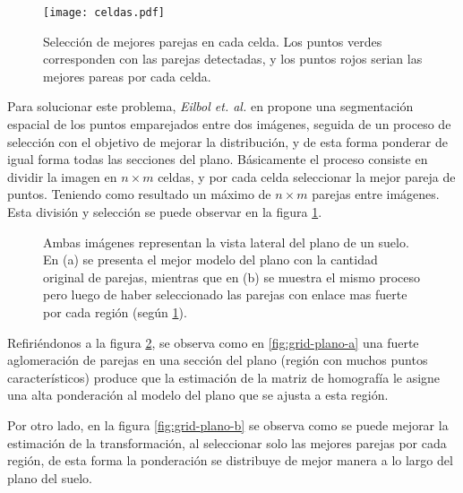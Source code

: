 \begin{figure}[hb]
	\centering
	\texttt{[image: celdas.pdf]}
	\caption[Selección de mejores parejas]{Selección de mejores parejas en cada celda. Los puntos verdes corresponden con las parejas detectadas, y los puntos rojos serian las mejores pareas por cada celda.}
	\label{imagen:celdas}
\end{figure}

Para solucionar este problema, \textit{Eilbol et. al.} en \cite{grid} propone una segmentación espacial de los puntos emparejados entre dos imágenes, seguida de un proceso de selección con el objetivo de mejorar la distribución, y de esta forma ponderar de igual forma todas las secciones del plano. Básicamente el proceso consiste en dividir la imagen en $n\times m$ celdas, y por cada celda seleccionar la mejor pareja de puntos. Teniendo como resultado un máximo de $n\times m$ parejas entre imágenes. Esta división y selección se puede observar en la figura \ref{imagen:celdas}.

\begin{figure}[ht]
	\centering     %
	
	\caption[Selección de mejores puntos, ejemplo con plano]{Ambas imágenes representan la vista lateral del plano de un suelo. En (a) se presenta el mejor modelo del plano con la cantidad original de parejas, mientras que en (b) se muestra el mismo proceso pero luego de haber seleccionado las parejas con enlace mas fuerte por cada región (según \ref{imagen:celdas}).}
	\label{imagen:grid-plano}
\end{figure}

Refiriéndonos a la figura \ref{imagen:grid-plano}, se observa como en \ref{fig:grid-plano-a} una fuerte aglomeración de parejas en una sección del plano (región con muchos puntos característicos) produce que la estimación de la matriz de homografía le asigne una alta ponderación al modelo del plano que se ajusta a esta región.

Por otro lado, en la figura  \ref{fig:grid-plano-b} se observa como se puede mejorar la estimación de la transformación, al seleccionar solo las mejores parejas por cada región, de esta forma la ponderación se distribuye de mejor manera a lo largo del plano del suelo.

